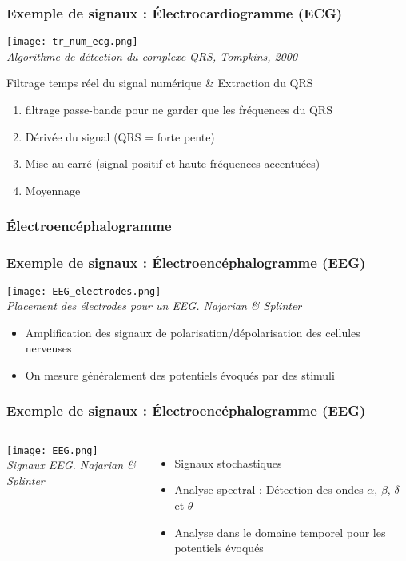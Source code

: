 \documentclass{beamer}
\begin{document}
\begin{frame}
\frametitle{Exemple de signaux : \'Electrocardiogramme (ECG)}
\begin{center}
\texttt{[image: tr\_num\_ecg.png]}\\
\textit{\footnotesize Algorithme de détection du complexe QRS, Tompkins, 2000}\\
\end{center}
Filtrage temps réel du signal numérique \& Extraction du QRS
\begin{enumerate}
\item<2-> filtrage passe-bande pour ne garder que les fréquences du QRS
\item<3-> Dérivée du signal (QRS = forte pente)
\item<4-> Mise au carré (signal positif et haute fréquences accentuées)
\item<5-> Moyennage
\end{enumerate}
\end{frame}

\subsubsection{\'Electroencéphalogramme}
\begin{frame}
\frametitle{Exemple de signaux : \'Electroencéphalogramme (EEG)}
\begin{center}
\texttt{[image: EEG\_electrodes.png]}\\
\textit{\footnotesize Placement des électrodes pour un EEG. Najarian \& Splinter}
\end{center}
\vspace{0.2cm}
\begin{itemize}
\item Amplification des signaux de polarisation/dépolarisation des cellules nerveuses
\item On mesure généralement des potentiels évoqués par des stimuli
\end{itemize}

\end{frame}

\begin{frame}
\frametitle{Exemple de signaux : \'Electroencéphalogramme (EEG)}
\begin{columns}
\column{60mm}
\texttt{[image: EEG.png]}\\
\textit{\footnotesize Signaux EEG. Najarian \& Splinter}
\column{60mm}
\begin{itemize}
\item Signaux stochastiques 
\vspace{0.2cm}
\item Analyse spectral : Détection des ondes $\alpha$, $\beta$, $\delta$ et $\theta$
\vspace{0.2cm}
\item Analyse dans le domaine temporel pour les potentiels évoqués
\end{itemize}
\end{columns}
\end{frame}
\end{document}
